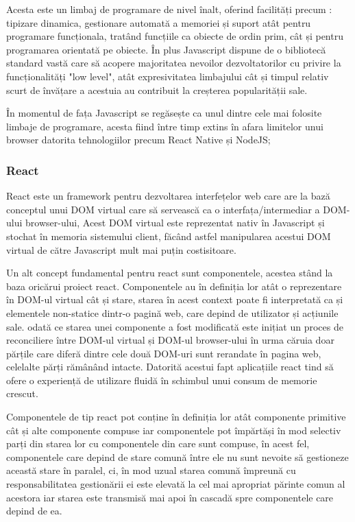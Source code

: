 \documentclass[12pt,a4paper,hidelinks]{report}
\theoremstyle{definition}
\theoremstyle{remark}
\begin{document}
Acesta este un limbaj de programare de nivel înalt, oferind facilități precum : tipizare dinamica, gestionare automată
a memoriei și suport atât pentru programare funcționala, tratând funcțiile ca obiecte de ordin prim,
cât și pentru programarea orientată pe obiecte. În plus Javascript dispune de o bibliotecă standard vastă care să acopere
majoritatea nevoilor dezvoltatorilor cu privire la funcționalități "low level", atât expresivitatea limbajului
cât și timpul relativ scurt de învățare a acestuia au contribuit la creșterea popularității sale.

În momentul de fața Javascript se regăsește ca unul dintre cele mai folosite limbaje de programare,
acesta fiind între timp extins în afara limitelor unui browser datorita tehnologiilor precum React Native și NodeJS;

\subsubsection{React}
React\cite{1} este un framework pentru dezvoltarea interfețelor web
care are la bază conceptul unui DOM virtual care să servească ca o interfața/intermediar a DOM-ului browser-ului,
Acest DOM virtual este reprezentat nativ în Javascript și stochat în memoria sistemului client, făcând astfel
manipularea acestui DOM virtual de către Javascript mult mai puțin costisitoare.

Un alt concept fundamental pentru react sunt componentele, acestea stând la baza oricărui proiect react.
Componentele au în definiția lor atât o reprezentare în DOM-ul virtual cât și stare, starea în acest context
poate fi interpretată ca și elementele non-statice dintr-o pagină web, care depind de utilizator și acțiunile sale.
odată ce starea unei componente a fost modificată este inițiat un proces de reconciliere între  DOM-ul virtual și DOM-ul
browser-ului în urma căruia doar părțile care diferă dintre cele două DOM-uri sunt rerandate în pagina web, celelalte părți 
rămânând intacte. Datorită acestui fapt aplicațiile react tind să ofere o experiență de utilizare fluidă în schimbul
unui consum de memorie crescut.

Componentele de tip react pot conține în definiția lor atât componente primitive cât
și alte componente compuse iar componentele pot împărtăși în mod selectiv parți din starea lor cu componentele
din care sunt compuse, în acest fel, componentele care depind de stare comună între ele nu sunt nevoite să
gestioneze această stare în paralel, ci, în mod uzual starea comună împreună cu responsabilitatea gestionării ei 
este elevată la cel mai apropriat părinte comun al acestora iar starea este transmisă mai apoi în cascadă spre componentele care depind de ea. 
\end{document}
